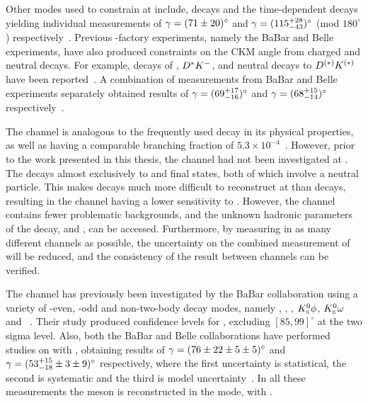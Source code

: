 Other modes used to constrain \Pgamma at \lhcb include, \decay{\Bz}{\D\Kstarz} decays and the time-dependent \decay{\Bs}{\Dspm\Kmp} decays yielding individual measurements of $\gamma = (71 \pm 20)^{\circ}$ and $\gamma = (115^{+28}_{-43})^{\circ}$ (mod $180^{\circ}$) respectively~\cite{LHCb-PAPER-2016-006,LHCb-PAPER-2014-038}. Previous \B-factory experiments, namely the BaBar and Belle experiments, have also produced constraints on the CKM angle \Pgamma from charged and neutral \B decays. For example, decays of \decay{\Bm}{\D\Km}, ${D}^*{{K}^-}$, \D\Kstarm and neutral \B decays to ${D}^{(*)}K^{(*)}$ have been reported~\cite{BabarGLW_latest,BabarADS_latest,BaBar-Gamma-2013,BaBarGGSZ,BaBar_B0,BelleGLW_latest,BelleADS_latest,BelleGGSZ}. A combination of measurements from BaBar and Belle experiments separately obtained results of $\gamma = (69^{+17}_{-16})^{\circ}$ and $\gamma = (68^{+15}_{-14})^{\circ}$ respectively~\cite{Babar_gamma,Belle_gamma}.

The \decay{\Bm}{\D\Kstarm} channel is analogous to the frequently used \decay{\Bm}{\D\Km} decay in its physical properties, as well as having a comparable branching fraction of $5.3 \times 10^{-4}$~\cite{PDG2016}. However, prior to the work presented in this thesis, the \decay{\Bm}{\D\Kstarm} channel had not been investigated at \lhcb. The \Kstarm decays almost exclusively to \Kz\pim and \Km\piz final states, both of which involve a neutral particle. This makes \decay{\Bm}{\D\Kstarm} decays much more difficult to reconstruct at \lhcb than \decay{\Bm}{\D\Km} decays, resulting in the \decay{\Bm}{\D\Kstarm} channel having a lower sensitivity to \Pgamma. However, the \decay{\Bm}{\D\Kstarm} channel contains fewer problematic backgrounds, and the unknown hadronic parameters of the \decay{\Bm}{\D\Kstarm} decay, \rb and \deltab, can be accessed. Furthermore, by measuring \Pgamma in as many different channels as possible, the uncertainty on the combined measurement of \Pgamma will be reduced, and the consistency of the result between channels can be verified. 

The \decay{\Bm}{\D\Kstarm} channel has previously been investigated by the BaBar collaboration using a variety of \CP-even, \CP-odd and non-\CP two-body \D decay modes, namely \Km\Kp, \pim\pip, \KS\piz, ${{K}^0_{\mathrm{ \scriptscriptstyle S}}}\phi$, ${{K}^0_{\mathrm{ \scriptscriptstyle S}}}\omega$ and \Km\pip~\cite{BaBarDKstar}. Their study produced confidence levels for \Pgamma, excluding $[85,99]^{\circ}$ at the two sigma level. Also, both the BaBar and Belle collaborations have performed studies on \decay{\Bm}{\D\Kstarm} with \decay{\D}{\KS\pip\pim}, obtaining results of $\gamma = (76 \pm 22 \pm 5 \pm 5)^{\circ}$ and $\gamma = (53^{+15}_{-18} \pm 3 \pm 9)^{\circ}$ respectively, where the first uncertainty is statistical, the second is systematic and the third is model uncertainty~\cite{BaBarGGSZ,BelleGGSZ}. In all these measurements the \Kstarm meson is reconstructed in the \KS\pim mode, with \decay{\KS}{\pip\pim}.

